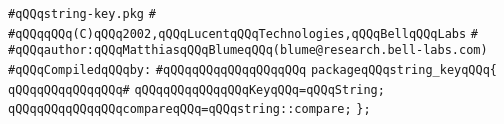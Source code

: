 \label{src/lib/src/string-key.pkg}
\verb|#qQQqstring-key.pkg|\newline
\verb|#|\newline
\verb|#qQQqqQQq(C)qQQq2002,qQQqLucentqQQqTechnologies,qQQqBellqQQqLabs|\newline
\verb|#|\newline
\verb|#qQQqauthor:qQQqMatthiasqQQqBlumeqQQq(blume@research.bell-labs.com)|\newline
\newline
\verb|#qQQqCompiledqQQqby:|\newline
\verb|#qQQqqQQqqQQqqQQqqQQq|\newline
\newline
\verb|packageqQQqstring_keyqQQq{|\newline
\verb|qQQqqQQqqQQqqQQq#|\newline
\verb|qQQqqQQqqQQqqQQqKeyqQQq=qQQqString;|\newline
\verb|qQQqqQQqqQQqqQQqcompareqQQq=qQQqstring::compare;|\newline
\verb|};|\newline

